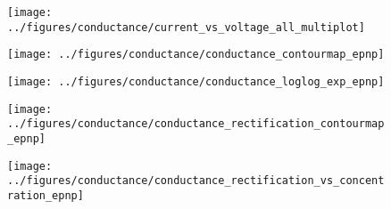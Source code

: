 \begin{figure*}[!p]
  \centering

  \begin{minipage}[l]{16cm}
    \begin{minipage}[h]{5cm}
      \begin{subfigure}[t]{4.5cm}
        \centering
        \caption{}\vspace{-3mm}\label{fig:current-voltage_curves}
        \texttt{[image: ../figures/conductance/current\_vs\_voltage\_all\_multiplot]}
      \end{subfigure}
    \end{minipage}
    \begin{minipage}[r]{11cm}
      \begin{minipage}[h]{10.5cm}
        \begin{subfigure}[t]{5cm}
          \centering
          \caption{}\vspace{-5mm}\label{fig:conductance_contourmap_epnp}
          \texttt{[image: ../figures/conductance/conductance\_contourmap\_epnp]}
        \end{subfigure}
        \begin{subfigure}[t]{5cm}
          \centering
          \caption{}\vspace{-5mm}\label{fig:conductance_loglog_exp_epnp}
          \texttt{[image: ../figures/conductance/conductance\_loglog\_exp\_epnp]}
        \end{subfigure}
      \end{minipage}
      \vspace{5mm}
      \begin{minipage}[h]{10.5cm}
        \begin{subfigure}[t]{5cm}
          \centering
          \caption{}\vspace{-5mm}\label{fig:conductance_rectification_contourmap_epnp}
          \texttt{[image: ../figures/conductance/conductance\_rectification\_contourmap\_epnp]}
        \end{subfigure}
        \begin{subfigure}[t]{5cm}
          \centering
          \caption{}\vspace{-5mm}\label{fig:conductance_rectification_vs_concentration_epnp}
          \texttt{[image: ../figures/conductance/conductance\_rectification\_vs\_concentration\_epnp]}
        \end{subfigure}

\end{minipage}
\end{minipage}
\end{minipage}
\end{figure*}
